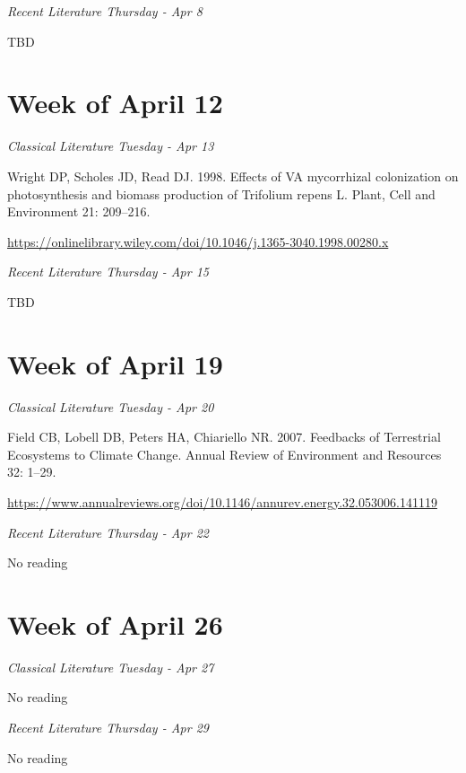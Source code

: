 \documentclass[12pt, notitlepage]{article}   	%
\begin{document}
{\textit{Recent Literature Thursday - Apr 8} \par
TBD

\section*{Week of April 12}
\textit{Classical Literature Tuesday - Apr 13} \par
Wright DP, Scholes JD, Read DJ. 1998. Effects of VA mycorrhizal colonization on 
photosynthesis and biomass production of Trifolium repens L. 
Plant, Cell and Environment 21: 209–216. \par
\url{https://onlinelibrary.wiley.com/doi/10.1046/j.1365-3040.1998.00280.x}

\textit{Recent Literature Thursday - Apr 15} \par
TBD

\section*{Week of April 19}
\textit{Classical Literature Tuesday - Apr 20} \par
Field CB, Lobell DB, Peters HA, Chiariello NR. 2007. Feedbacks of Terrestrial Ecosystems 
to Climate Change. Annual Review of Environment and Resources 32: 1–29. \par
\url{https://www.annualreviews.org/doi/10.1146/annurev.energy.32.053006.141119}

\textit{Recent Literature Thursday - Apr 22} \par
No reading \par

\section*{Week of April 26}
\textit{Classical Literature Tuesday - Apr 27} \par
No reading \par

\textit{Recent Literature Thursday - Apr 29} \par
No reading \par

} %
\end{document}
